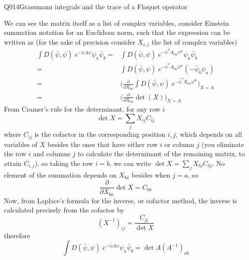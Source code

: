 \begin{entry}{Q014}{Grassmann integrals and the trace of a Floquet operator}
\begin{solution}[Part (b)]
We can see the matrix itself as a list of complex variables, consider Einstein summation notation for an Euclidean norm, such that the expression can be written as (for the sake of precision consider $X_{i,j}$ the list of complex variables)
\begin{equation}
\begin{split}
    \int D(\bar\psi,\psi)\; e^{-\bar\psi A\psi}\psi_a \bar\psi_b
    =&\int D(\bar\psi,\psi)\; e^{-\bar\psi^\nu A_{\nu\mu}\psi^\mu}\psi_a \bar\psi_b\\
    =& \int D(\bar\psi,\psi)\; e^{-\bar\psi^\nu A_{\nu\mu}\psi^\mu}(-\bar\psi_b \psi_a) \\
    =&\bigg(\frac{\partial}{\partial X_{ba}}\int D(\bar\psi,\psi)\; e^{-\bar\psi^\nu X_{\nu\mu}\psi^\mu}\bigg)_{X=A}\\
    =& \bigg(\frac{\partial}{\partial X_{ba}}\det(X)\bigg)_{X=A}
\end{split}
\end{equation}
From Cramer's rule for the determinant, for any row $i$
\begin{equation*}
    \det X = \sum_{j}X_{ij}C_{ij}
\end{equation*}
where $C_{ij}$ is the cofactor in the corresponding position $i,j$, which depends on all variables of $X$ besides the ones that have either row $i$ or column $j$ (you eliminate the row $i$ and columns $j$ to calculate the determinant of the remaining matrix, to attain $C_{i,j}$), so taking the row $i=b$, we can write $\det X = \sum_{j}X_{bj}C_{bj}$. No element of the summation depends on $X_{ba}$ besides when $j=a$, so
\begin{equation*}
    \frac{\partial}{\partial X_{ba}}\det X = C_{ba}
\end{equation*}
Now, from Laplace's formula for the inverse, or cofactor method, the inverse is calculated precisely from the cofactor by
$$(X^{-1})_{ij} =\frac{C_{ji} }{\det X}$$
therefore
\begin{equation}
    \int D(\bar\psi,\psi)\; e^{-\bar\psi A\psi}\psi_a \bar\psi_b
    = \det A (A^{-1})_{ab}
\end{equation}
\end{solution}


\end{entry}
